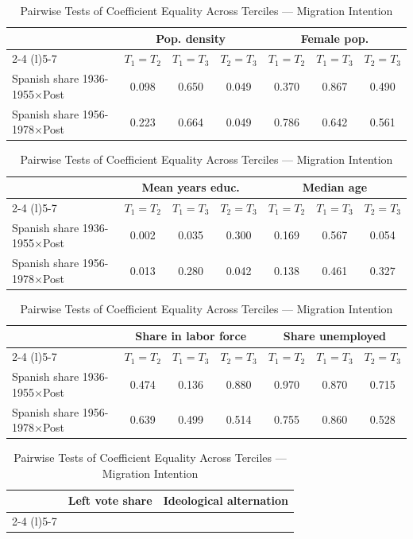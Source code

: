 \begin{table}[!h]
\centering
\renewcommand{\arraystretch}{1.15}
\setlength{\tabcolsep}{4pt}
\caption{Pairwise Tests of Coefficient Equality Across Terciles --- Migration Intention}
\begin{tabular*}{\textwidth}{l@{\extracolsep{\fill}}cccccc}
\hline
 & \multicolumn{3}{c}{Pop. density} & \multicolumn{3}{c}{Female pop.} \\
\cmidrule(l){2-4} \cmidrule(l){5-7}
 & $T_1 = T_2$ & $T_1 = T_3$ & $T_2 = T_3$ & $T_1 = T_2$ & $T_1 = T_3$ & $T_2 = T_3$ \\
\hline
Spanish share 1936-1955$\times$Post & 0.098 & 0.650 & 0.049 & 0.370 & 0.867 & 0.490 \\
Spanish share 1956-1978$\times$Post & 0.223 & 0.664 & 0.049 & 0.786 & 0.642 & 0.561 \\
\hline
\end{tabular*}
\begin{tabular*}{\textwidth}{l@{\extracolsep{\fill}}cccccc}
 & \multicolumn{3}{c}{Mean years educ.} & \multicolumn{3}{c}{Median age} \\
\cmidrule(l){2-4} \cmidrule(l){5-7}
 & $T_1 = T_2$ & $T_1 = T_3$ & $T_2 = T_3$ & $T_1 = T_2$ & $T_1 = T_3$ & $T_2 = T_3$ \\
\hline
Spanish share 1936-1955$\times$Post & 0.002 & 0.035 & 0.300 & 0.169 & 0.567 & 0.054 \\
Spanish share 1956-1978$\times$Post & 0.013 & 0.280 & 0.042 & 0.138 & 0.461 & 0.327 \\
\hline
\end{tabular*}
\begin{tabular*}{\textwidth}{l@{\extracolsep{\fill}}cccccc}
 & \multicolumn{3}{c}{Share in labor force} & \multicolumn{3}{c}{Share unemployed} \\
\cmidrule(l){2-4} \cmidrule(l){5-7}
 & $T_1 = T_2$ & $T_1 = T_3$ & $T_2 = T_3$ & $T_1 = T_2$ & $T_1 = T_3$ & $T_2 = T_3$ \\
\hline
Spanish share 1936-1955$\times$Post & 0.474 & 0.136 & 0.880 & 0.970 & 0.870 & 0.715 \\
Spanish share 1956-1978$\times$Post & 0.639 & 0.499 & 0.514 & 0.755 & 0.860 & 0.528 \\
\hline
\end{tabular*}
\begin{tabular*}{\textwidth}{l@{\extracolsep{\fill}}cccccc}
 & \multicolumn{3}{c}{Left vote share} & \multicolumn{3}{c}{Ideological alternation} \\
\cmidrule(l){2-4} \cmidrule(l){5-7}

\end{tabular*}
\end{table}
